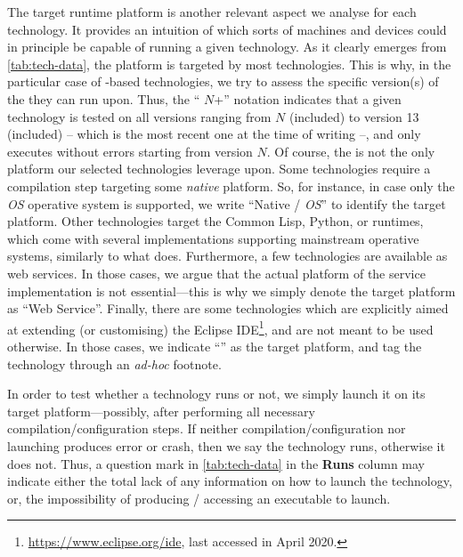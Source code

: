 \documentclass[12pt,a4paper,openright,twoside]{book}
\begin{document}
The target runtime platform is another relevant aspect we analyse for each technology.
%
It provides an intuition of which sorts of machines and devices could in principle be capable of running a given technology.
%
As it clearly emerges from \cref{tab:tech-data}, the \jvm{} platform is targeted by most technologies.
%
This is why, in the particular case of \jvm{}-based technologies, we try to assess the specific version(s) of the \jvm{} they can run upon.
%
Thus, the ``\jvm{} $N$+'' notation indicates that a given technology is tested on all \jvm{} versions ranging from $N$ (included) to version 13 (included) -- which is the most recent one at the time of writing --, and only executes without errors starting from version $N$.
%
Of course, the \jvm{} is not the only platform our selected technologies leverage upon.
%
Some technologies require a compilation step targeting some \emph{native} platform.
%
So, for instance, in case only the \textit{OS} operative system is supported, we write ``Native / \textit{OS}'' to identify the target platform.
%
Other technologies target the Common Lisp, Python, or \erlang{} runtimes, which come with several implementations supporting mainstream operative systems, similarly to what \jvm{} does.
%
%
Furthermore, a few technologies are available as web services.
%
In those cases, we argue that the actual platform of the service implementation is not essential---this is why we simply denote the target platform as ``Web Service''.
%
Finally, there are some technologies which are explicitly aimed at extending (or customising) the Eclipse IDE\footnote{\url{https://www.eclipse.org/ide}, last accessed in April 2020.}, and are not meant to be used otherwise.
%
In those cases, we indicate ``\jvm{}'' as the target platform, and tag the technology through an \emph{ad-hoc} footnote.

In order to test whether a technology runs or not, we simply launch it on its target platform---possibly, after performing all necessary compilation/confi\-guration steps.
%
If neither compilation/configuration nor launching produces error or crash, then we say the technology runs, otherwise it does not.
%
Thus, a question mark in \cref{tab:tech-data} in the \textbf{Runs} column may indicate either the total lack of any information on how to launch the technology, or, the impossibility of producing / accessing an executable to launch.
\end{document}
